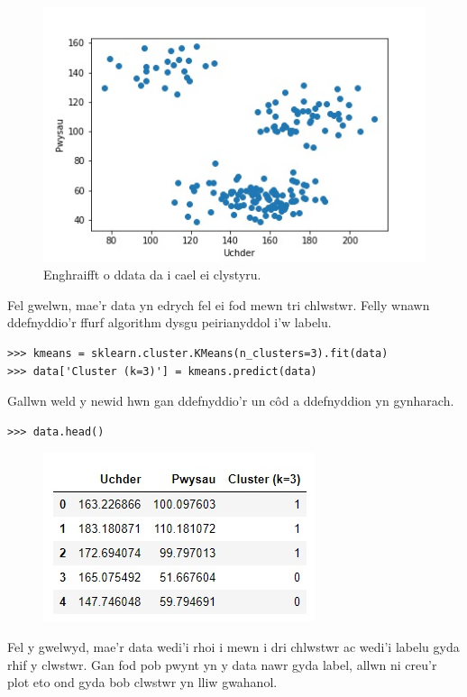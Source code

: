 \begin{figure}[H]
\begin{center}
\includegraphics[width=0.7\linewidth]{../img/Scatterpython.jpeg}
\end{center}
\caption{Enghraifft o ddata da i cael ei clystyru.}
\label{fig:Scatterpython}
\end{figure}

Fel gwelwn, mae'r data yn edrych fel ei fod mewn tri chlwstwr. Felly wnawn ddefnyddio'r ffurf algorithm dysgu peirianyddol i'w labelu.

\begin{verbatim}
>>> kmeans = sklearn.cluster.KMeans(n_clusters=3).fit(data)
>>> data['Cluster (k=3)'] = kmeans.predict(data)
\end{verbatim}

Gallwn weld y newid hwn gan ddefnyddio'r un c\^{o}d a ddefnyddion yn gynharach.

\begin{verbatim}
>>> data.head()
\end{verbatim}

\begin{figure}[H]
\begin{center}
\includegraphics[width=0.35\linewidth]{../img/tabl2.jpg}
\end{center}
\label{fig:Data2}
\end{figure}

Fel y gwelwyd, mae'r data wedi'i rhoi i mewn i dri chlwstwr ac wedi'i labelu gyda rhif y clwstwr. Gan fod pob pwynt yn y data nawr gyda label, allwn ni creu'r plot eto ond gyda bob clwstwr yn lliw gwahanol.

